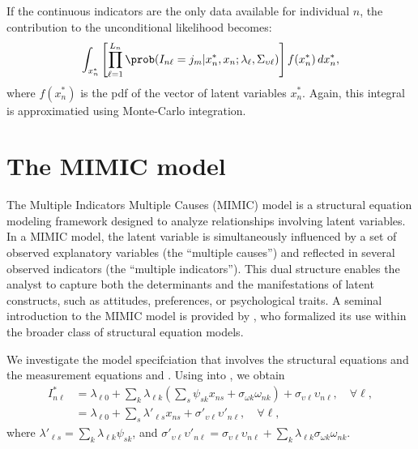 \documentclass[12pt,a4paper]{article}
\begin{document}
If the continuous indicators are the only data available for individual \( n \), the contribution to the unconditional likelihood becomes:
\begin{equation}
\int_{x_n^*} \left[ \prod_{\ell=1}^{L_n} \prob(I_{n\ell} = j_m| x^*_n, x_n ; \lambda_\ell, \Sigma_{\upsilon \ell})
\right] f(x_n^*) \, dx_n^*,
\end{equation}
where \( f(x_n^*) \) is the pdf of the vector of latent variables \( x_n^* \).
Again, this integral is approximatied using Monte-Carlo integration.


\section{The MIMIC model}

The Multiple Indicators Multiple Causes (MIMIC) model is a structural
equation modeling framework designed to analyze relationships
involving latent variables. In a MIMIC model, the latent variable is
simultaneously influenced by a set of observed explanatory variables
(the ``multiple causes'') and reflected in several observed indicators
(the ``multiple indicators''). This dual structure enables the analyst
to capture both the determinants and the manifestations of latent
constructs, such as attitudes, preferences, or psychological traits.
A seminal introduction to the MIMIC model is provided by
, who formalized its use within the
broader class of structural equation models.

We investigate the model specifciation that involves the structural equations  and the measurement equations  and .
Using  into  , we obtain
\begin{equation}
  \begin{aligned}
    I^*_{n\ell} &= \lambda_{\ell 0}  + \sum_k \lambda_{\ell k}  (\sum_s \psi_{sk} x_{ns} + \sigma_{\omega k} \omega_{nk}) + \sigma_{\upsilon \ell} \upsilon_{n\ell}, \quad \forall \ell, \\
    &= \lambda_{\ell 0} + \sum_s \lambda'_{\ell s} x_{ns} + \sigma'_{\upsilon \ell} \upsilon'_{n\ell}, \quad \forall \ell, 
  \end{aligned}
\end{equation}
where  $\lambda'_{\ell s}=\sum_k \lambda_{\ell k}  \psi_{sk}$, and $\sigma'_{\upsilon \ell} \upsilon'_{n\ell}= \sigma_{\upsilon \ell} \upsilon_{n\ell} + \sum_k \lambda_{\ell k}\sigma_{\omega k} \omega_{nk}$.
\end{document}
